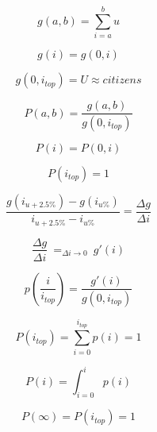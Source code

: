 \begin{equation} \label{eq:units_group}
	g(a,b)=\sum_{i=a}^{b} u
\end{equation}

\begin{equation} \label{eq:group}
	g(i)=g(0,i)
\end{equation}

\begin{equation} \label{eq:units_group_max}
	g(0,i_{top}) =
	U \approx citizens
\end{equation}

\begin{equation} \label{eq:units_group_propability}
	P(a,b)=\frac{g(a,b)}{g(0,i_{top})}
\end{equation}

\begin{equation} \label{eq:group_propability}
	P(i)=P(0,i)
\end{equation}

\begin{equation} \label{eq:overall_propability}
	P(i_{top})=1
\end{equation}

\begin{equation} \label{eq:delta_g_delta_i}
	\frac {g(i_{u+2.5\%})-g(i_{u\%})}{i_{u+2.5\%}-i_{u\%}}
	=\frac{\Delta g}{\Delta i}
\end{equation}

\begin{equation} \label{eq:group_density}
	\frac{\Delta g}{\Delta i}~
	=_{\Delta i \rightarrow 0}
	~ g'(i)
\end{equation}

\begin{equation} \label{eq:propability_density}
	p(\frac{i}{i_{top}})=\frac{g'(i)}{g(0,i_{top})}
\end{equation}

\begin{equation} \label{eq:propability_distribution}
	P(i_{top})=\sum_{i=0}^{i_{top}} p(i)=1
\end{equation}

\begin{equation} \label{eq:propability}
	P(i)=\int_{i=0}^i p(i)
\end{equation}

\begin{equation} \label{eq:propability_overall}
	P(\infty)= P(i_{top})= 1
\end{equation}

